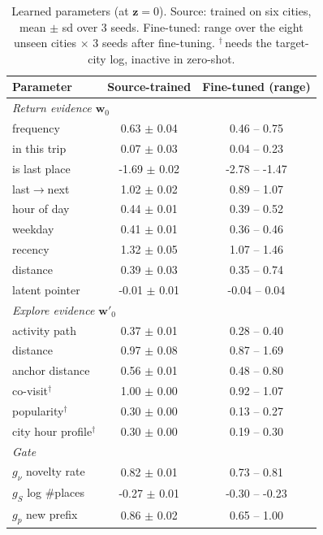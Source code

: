\begin{table}[t]
\caption{Learned parameters (at $\mathbf{z}=0$). Source: trained on six cities, mean $\pm$ sd over 3 seeds.
Fine-tuned: range over the eight unseen cities $\times$ 3 seeds after fine-tuning. $^\dagger$\,needs the target-city log,
inactive in zero-shot.}
\label{tab:weights}
\small\setlength{\tabcolsep}{4pt}
\begin{tabular}{lcc}
\toprule
Parameter & Source-trained & Fine-tuned (range) \\
\midrule
\multicolumn{3}{l}{\textit{Return evidence $\mathbf{w}_0$}} \\
frequency & 0.63 $\pm$ 0.04 & 0.46 -- 0.75 \\
in this trip & 0.07 $\pm$ 0.03 & 0.04 -- 0.23 \\
is last place & -1.69 $\pm$ 0.02 & -2.78 -- -1.47 \\
last$\to$next & 1.02 $\pm$ 0.02 & 0.89 -- 1.07 \\
hour of day & 0.44 $\pm$ 0.01 & 0.39 -- 0.52 \\
weekday & 0.41 $\pm$ 0.01 & 0.36 -- 0.46 \\
recency & 1.32 $\pm$ 0.05 & 1.07 -- 1.46 \\
distance & 0.39 $\pm$ 0.03 & 0.35 -- 0.74 \\
latent pointer & -0.01 $\pm$ 0.01 & -0.04 -- 0.04 \\
\midrule
\multicolumn{3}{l}{\textit{Explore evidence $\mathbf{w}'_0$}} \\
activity path & 0.37 $\pm$ 0.01 & 0.28 -- 0.40 \\
distance & 0.97 $\pm$ 0.08 & 0.87 -- 1.69 \\
anchor distance & 0.56 $\pm$ 0.01 & 0.48 -- 0.80 \\
co-visit$^\dagger$ & 1.00 $\pm$ 0.00 & 0.92 -- 1.07 \\
popularity$^\dagger$ & 0.30 $\pm$ 0.00 & 0.13 -- 0.27 \\
city hour profile$^\dagger$ & 0.30 $\pm$ 0.00 & 0.19 -- 0.30 \\
\midrule
\multicolumn{3}{l}{\textit{Gate}} \\
$g_\nu$ novelty rate & 0.82 $\pm$ 0.01 & 0.73 -- 0.81 \\
$g_S$ log \#places & -0.27 $\pm$ 0.01 & -0.30 -- -0.23 \\
$g_p$ new prefix & 0.86 $\pm$ 0.02 & 0.65 -- 1.00 \\
\bottomrule
\end{tabular}
\end{table}
